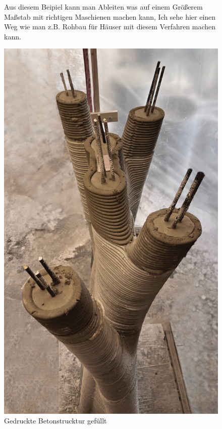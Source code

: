 \documentclass{article}
\begin{document}
\begin{figure}[H]
\begin{minipage}{0.4\textwidth}
            Aus diesem Beipiel kann man Ableiten was auf einem Gr\"o\ss{}erem Ma\ss{}stab mit richtigen 
            Maschienen machen kann, Ich sehe hier einen Weg wie man z.B. Rohbau f\"ur H\"auser mit diesem 
            Verfahren machen kann.
        \end{minipage}
        \begin{minipage}{0.25\textwidth}
           \centering
           \includegraphics[width=\linewidth]{figures/beispiele/meibodi-2023-2.jpg}
           \caption{Gedruckte Betonstrucktur gef\"ullt \parencite{meibodi2023}}
           \label{fig:voll}
        \end{minipage}
    \end{figure}
\end{document}
